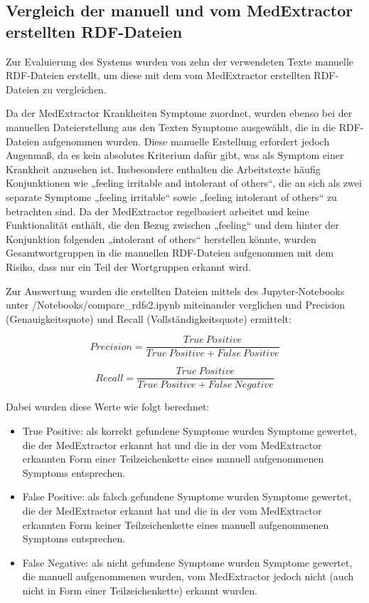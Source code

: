 

\subsection{Vergleich der manuell und vom MedExtractor erstellten RDF-Dateien}
\label{subsec:RDF-Vergleich} 

Zur Evaluierung des Systems wurden von zehn der verwendeten Texte manuelle RDF-Dateien erstellt, um diese mit dem vom MedExtractor erstellten RDF-Dateien zu vergleichen. 

Da der MedExtractor Krankheiten Symptome zuordnet, wurden ebenso bei der manuellen Dateierstellung aus den Texten Symptome ausgewählt, die in die RDF-Dateien aufgenommen wurden. Diese manuelle Erstellung erfordert jedoch Augenmaß, da es kein absolutes Kriterium dafür gibt, was als Symptom einer Krankheit anzusehen ist. Insbesondere enthalten die Arbeitstexte häufig Konjunktionen wie „feeling irritable and intolerant of others“, die an sich als zwei separate Symptome „feeling irritable“ sowie „feeling intolerant of others“ zu betrachten sind. Da der MedExtractor regelbasiert arbeitet und keine Funktionalität enthält, die den Bezug zwischen „feeling“ und dem hinter der Konjunktion folgenden „intolerant of others“ herstellen könnte, wurden Gesamtwortgruppen in die manuellen RDF-Dateien aufgenommen mit dem Risiko, dass nur ein Teil der Wortgruppen erkannt wird.

Zur Auswertung wurden die erstellten Dateien mittels des Jupyter-Notebooks unter /Notebooks/compare\_rdfs2.ipynb miteinander verglichen und Precision (Genauigkeitsquote) und Recall (Vollständigkeitsquote) ermittelt:

\[ Precision = \frac{True\ Positive}{True\ Positive + False\ Positive} \]

\[ Recall = \frac{True\ Positive}{True\ Positive + False\ Negative} \]

Dabei wurden diese Werte wie folgt berechnet:
\begin{itemize}
\item True Positive: als korrekt gefundene Symptome wurden Symptome gewertet, die der MedExtractor erkannt hat und die in der vom MedExtractor erkannten Form einer Teilzeichenkette eines manuell aufgenommenen Symptoms entsprechen. 
\item False Positive: als falsch gefundene Symptome wurden Symptome gewertet, die der MedExtractor erkannt hat und die in der vom MedExtractor erkannten Form keiner Teilzeichenkette eines manuell aufgenommenen Symptoms entsprechen.
\item False Negative: als nicht gefundene Symptome wurden Symptome gewertet, die manuell aufgenommenen wurden, vom MedExtractor jedoch nicht (auch nicht in Form einer Teilzeichenkette) erkannt wurden.
\end{itemize}

